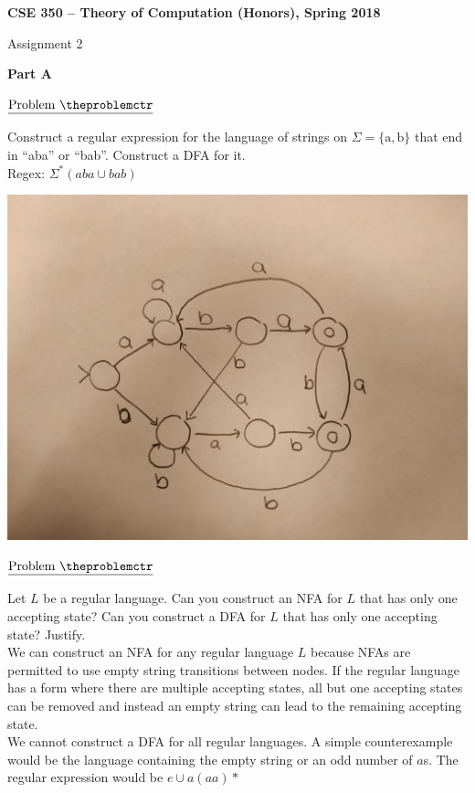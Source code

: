 \documentclass[11pt]{article}
\def\pp{\par\noindent}
\begin{document}
\centerline{\bf CSE 350 -- Theory of Computation (Honors), Spring 2018}
\medskip
\centerline{Assignment 2}
\bigskip

\bigskip
{}

\centerline{\bf Part A}

\addtocounter{problemctr}{1}
\bigskip
\noindent
$\underline{\rm Problem\ \theproblemctr}$ \pp

\noindent
Construct a regular expression for the language of strings on
$\Sigma = \{\mbox{a}, \mbox{b}\}$
that end in ``aba'' or ``bab''.
Construct a DFA for it.\\

Regex: $\Sigma^*(aba\cup bab)$

\includegraphics[scale=0.1]{q1.jpg}

\addtocounter{problemctr}{1}
\bigskip
\noindent
$\underline{\rm Problem\ \theproblemctr}$ \pp

\noindent
Let $L$ be a regular language. Can you construct an NFA for $L$ that has only one accepting state? Can you construct a DFA for $L$ that has only one accepting state? Justify.\\

We can construct an NFA for any regular language $L$ because NFAs are permitted to use empty string transitions between nodes. If the regular language has a form where there are multiple accepting states, all but one accepting states can be removed and instead an empty string can lead to the remaining accepting state.\\

We cannot construct a DFA for all regular languages. A simple counterexample would be the language containing the empty string or an odd number of $a$s. The regular expression would be $e\cup a(aa)*$\\
\end{document}
